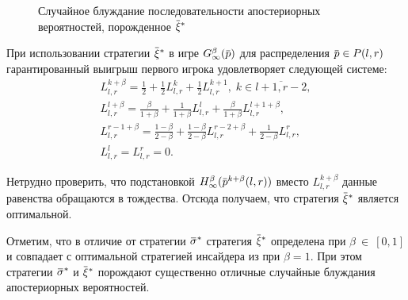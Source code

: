 {\begin{figure}[tbh]
  \small
  \centering
  \caption[Последовательность апостериорных вероятностей]{Случайное блуждание последовательности апостериорных вероятностей, порожденное $\xiv^*$}
  \label{ch3:fig:posterior-2}
\end{figure}

При использовании стратегии $\xiv^*$ в игре $\theG[\infty](\p)$ для распределения $\p \in P(l,r)$ гарантированный выигрыш первого игрока удовлетворяет следующей системе:
\begin{equation*}
  \begin{gathered}
    L^{k+\beta}_{l,r} =
    \frac{1}{2} + \frac{1}{2} L^k_{l,r} + \frac{1}{2} L^{k+1}_{l,r}, \;
    k \in \overline{l+1, r-2}, \\
    L^{l+\beta}_{l,r} =
    \frac{\beta}{1+\beta} + \frac{1}{1+\beta} L^l_{l,r} + \frac{\beta}{1+\beta} L^{l+1+\beta}_{l,r},\\
    L^{r-1+\beta}_{l,r} =
    \frac{1-\beta}{2-\beta} + \frac{1-\beta}{2-\beta} L^{r-2+\beta}_{l,r} + \frac{1}{2-\beta} L^r_{l,r},\\
    L^l_{l,r} = L^r_{l,r} = 0.
  \end{gathered}
\end{equation*}

Нетрудно проверить, что подстановкой $\High(\p^{k+\beta}(l,r))$ вместо $L^{k+\beta}_{l,r}$ данные равенства обращаются в тождества.
Отсюда получаем, что стратегия $\xiv^*$ является оптимальной.

Отметим, что в отличие от стратегии $\sigmav^*$ стратегия $\xiv^*$ определена при $\beta~\in~[0, 1]$ и совпадает с оптимальной стратегией инсайдера из \cite{domansky11} при $\beta = 1$.
При этом стратегии $\sigmav^*$ и $\xiv^*$ порождают существенно отличные случайные блуждания апостериорных вероятностей.

\clearpage
}

